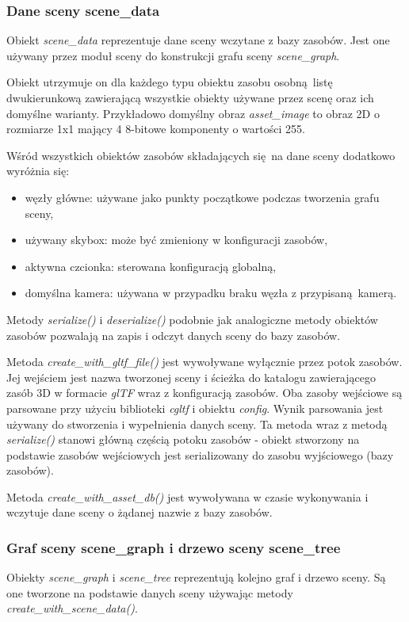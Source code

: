 \subsubsection{Dane sceny scene\_data}
Obiekt \textit{scene\_data} reprezentuje dane sceny wczytane z bazy zasobów. Jest one używany przez moduł sceny do konstrukcji grafu sceny \textit{scene\_graph}.

Obiekt utrzymuje on dla każdego typu obiektu zasobu osobną listę dwukierunkową zawierającą wszystkie obiekty używane przez scenę oraz ich domyślne warianty. Przykładowo domyślny obraz \textit{asset\_image} to obraz 2D o rozmiarze 1x1 mający 4 8-bitowe komponenty o wartości 255.

Wśród wszystkich obiektów zasobów składających się na dane sceny dodatkowo wyróżnia się:
\begin{itemize}
	\item węzły główne: używane jako punkty początkowe podczas tworzenia grafu sceny,
	\item używany skybox: może być zmieniony w konfiguracji zasobów,
	\item aktywna czcionka: sterowana konfiguracją globalną,
	\item domyślna kamera: używana w przypadku braku węzła z przypisaną kamerą.
\end{itemize}

Metody \textit{serialize()} i \textit{deserialize()} podobnie jak analogiczne metody obiektów zasobów pozwalają na zapis i odczyt danych sceny do bazy zasobów.

Metoda \textit{create\_with\_gltf\_file()} jest wywoływane wyłącznie przez potok zasobów.
Jej wejściem jest nazwa tworzonej sceny i ścieżka do katalogu zawierającego zasób 3D w formacie \textit{glTF} wraz z konfiguracją zasobów.
Oba zasoby wejściowe są parsowane przy użyciu biblioteki \textit{cgltf} i obiektu \textit{config}.
Wynik parsowania jest używany do stworzenia i wypełnienia danych sceny.
Ta metoda wraz z metodą \textit{serialize()} stanowi główną częścią potoku zasobów - obiekt stworzony na podstawie zasobów wejściowych jest serializowany do zasobu wyjściowego (bazy zasobów).

Metoda \textit{create\_with\_asset\_db()} jest wywoływana w czasie wykonywania i wczytuje dane sceny o żądanej nazwie z bazy zasobów.

\subsubsection{Graf sceny scene\_graph i drzewo sceny scene\_tree}
Obiekty \textit{scene\_graph} i \textit{scene\_tree} reprezentują kolejno graf i drzewo sceny.
Są one tworzone na podstawie danych sceny używając metody \textit{create\_with\_scene\_data()}.

